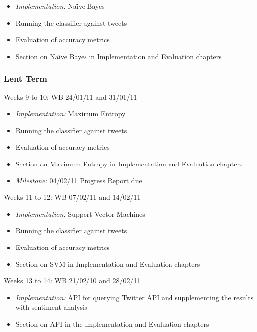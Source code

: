 \begin{itemize}

\item \emph{Implementation:} Na\"{\i}ve Bayes
\item Running the classifier against tweets
\item Evaluation of accuracy metrics
\item Section on Na\"{\i}ve Bayes in Implementation and Evaluation chapters

\end{itemize}

\subsubsection*{Lent Term}

\noindent
Weeks 9 to 10: WB 24/01/11 and 31/01/11

\begin{itemize}

\item \emph{Implementation:} Maximum Entropy
\item Running the classifier against tweets
\item Evaluation of accuracy metrics
\item Section on Maximum Entropy in Implementation and Evaluation chapters
\item \emph{Milestone:} 04/02/11 Progress Report due

\end{itemize}

\noindent
Weeks 11 to 12: WB 07/02/11 and 14/02/11

\begin{itemize}

\item \emph{Implementation:} Support Vector Machines
\item Running the classifier against tweets
\item Evaluation of accuracy metrics
\item Section on SVM in Implementation and Evaluation chapters

\end{itemize}

\noindent
Weeks 13 to 14: WB 21/02/10 and 28/02/11

\begin{itemize}

\item \emph{Implementation:} API for querying Twitter API and supplementing the results with sentiment analysis
\item Section on API in the Implementation and Evaluation chapters

\end{itemize}

